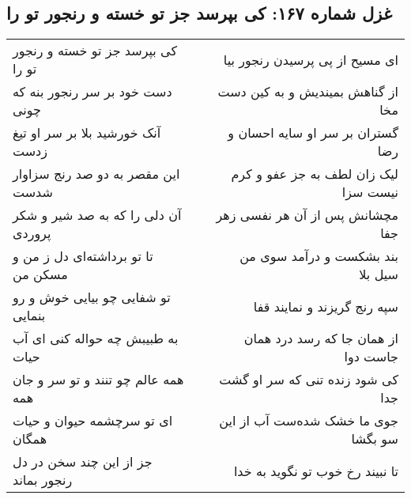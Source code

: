 \begin{center}
\section*{غزل شماره ۱۶۷: کی بپرسد جز تو خسته و رنجور تو را}
\label{sec:0167}
\begin{longtable}{l p{0.5cm} r}
کی بپرسد جز تو خسته و رنجور تو را
&&
ای مسیح از پی پرسیدن رنجور بیا
\\
دست خود بر سر رنجور بنه که چونی
&&
از گناهش بمیندیش و به کین دست مخا
\\
آنک خورشید بلا بر سر او تیغ زدست
&&
گستران بر سر او سایه احسان و رضا
\\
این مقصر به دو صد رنج سزاوار شدست
&&
لیک زان لطف به جز عفو و کرم نیست سزا
\\
آن دلی را که به صد شیر و شکر پروردی
&&
مچشانش پس از آن هر نفسی زهر جفا
\\
تا تو برداشته‌ای دل ز من و مسکن من
&&
بند بشکست و درآمد سوی من سیل بلا
\\
تو شفایی چو بیایی خوش و رو بنمایی
&&
سپه رنج گریزند و نمایند قفا
\\
به طبیبش چه حواله کنی ای آب حیات
&&
از همان جا که رسد درد همان جاست دوا
\\
همه عالم چو تنند و تو سر و جان همه
&&
کی شود زنده تنی که سر او گشت جدا
\\
ای تو سرچشمه حیوان و حیات همگان
&&
جوی ما خشک شده‌ست آب از این سو بگشا
\\
جز از این چند سخن در دل رنجور بماند
&&
تا نبیند رخ خوب تو نگوید به خدا
\\
\end{longtable}
\end{center}
